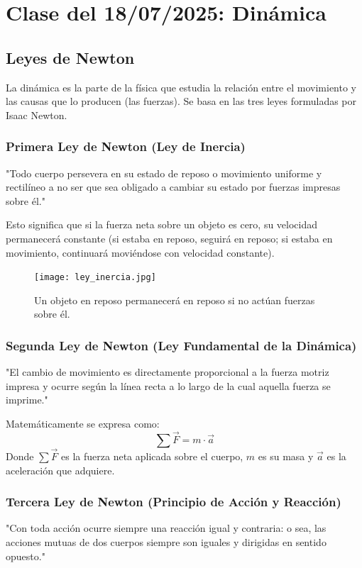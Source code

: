 \documentclass[11pt]{article}
\begin{document}
\newpage
\section{Clase del 18/07/2025: Dinámica}

\subsection{Leyes de Newton}
La dinámica es la parte de la física que estudia la relación entre el movimiento y las causas que lo producen (las fuerzas). Se basa en las tres leyes formuladas por Isaac Newton.

\subsubsection{Primera Ley de Newton (Ley de Inercia)}
"Todo cuerpo persevera en su estado de reposo o movimiento uniforme y rectilíneo a no ser que sea obligado a cambiar su estado por fuerzas impresas sobre él."

Esto significa que si la fuerza neta sobre un objeto es cero, su velocidad permanecerá constante (si estaba en reposo, seguirá en reposo; si estaba en movimiento, continuará moviéndose con velocidad constante).

\begin{figure}[h!]
	\centering
	\texttt{[image: ley\_inercia.jpg]}
	\caption{Un objeto en reposo permanecerá en reposo si no actúan fuerzas sobre él.}
\end{figure}

\subsubsection{Segunda Ley de Newton (Ley Fundamental de la Dinámica)}
"El cambio de movimiento es directamente proporcional a la fuerza motriz impresa y ocurre según la línea recta a lo largo de la cual aquella fuerza se imprime."

Matemáticamente se expresa como:
\[ \sum \vec{F} = m \cdot \vec{a} \]
Donde $\sum \vec{F}$ es la fuerza neta aplicada sobre el cuerpo, $m$ es su masa y $\vec{a}$ es la aceleración que adquiere.

\subsubsection{Tercera Ley de Newton (Principio de Acción y Reacción)}
"Con toda acción ocurre siempre una reacción igual y contraria: o sea, las acciones mutuas de dos cuerpos siempre son iguales y dirigidas en sentido opuesto."
\end{document}

